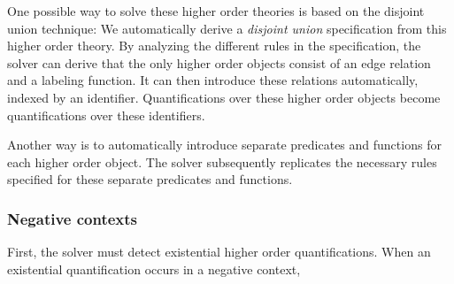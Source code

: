 One possible way to solve these higher order theories is based on the disjoint union technique: 
We automatically derive a \emph{disjoint union} specification from this higher order theory.
By analyzing the different rules in the specification, the solver can derive that the only  higher order objects consist of an edge relation and a labeling function.
It can then introduce these relations automatically, indexed by an identifier.
Quantifications over these higher order objects become quantifications over these identifiers.

Another way is to automatically introduce separate predicates and functions for each higher order object. 
The solver subsequently replicates the necessary rules specified for these separate predicates and functions. 

\subsubsection{Negative contexts}
First, the solver must detect existential higher order quantifications.
When an existential quantification occurs in a negative context, 

